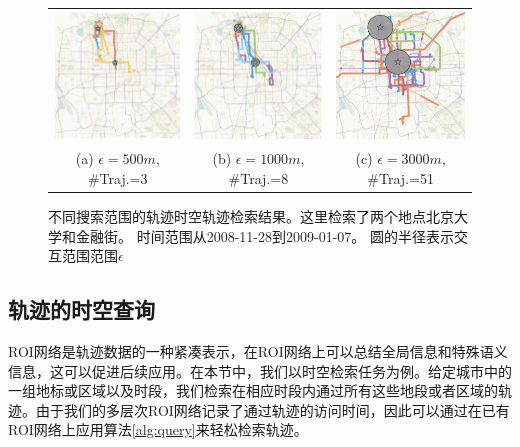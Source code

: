 \tabcolsep=1pt
\begin{figure}[!t]
\centering
\begin{tabular}{ccc}
\includegraphics[width=48mm]{pics/q500.eps}&
\includegraphics[width=48mm]{pics/q1000.eps}&
\includegraphics[width=48mm]{pics/q3000.eps}\\
(a) $\epsilon = 500m$, \#Traj.=3 & (b) $\epsilon = 1000m$, \#Traj.=8 & (c) $\epsilon = 3000m$, \#Traj.=51  \\
\end{tabular}
\caption{不同搜索范围的轨迹时空轨迹检索结果。这里检索了两个地点北京大学和金融街。 时间范围从2008-11-28到2009-01-07。 圆的半径表示交互范围范围$\epsilon$
}
\label{fig:queryResult}
\end{figure}


\subsection{轨迹的时空查询}
ROI网络是轨迹数据的一种紧凑表示，在ROI网络上可以总结全局信息和特殊语义信息，这可以促进后续应用。在本节中，我们以时空检索任务为例。给定城市中的一组地标或区域以及时段，我们检索在相应时段内通过所有这些地段或者区域的轨迹。由于我们的多层次ROI网络记录了通过轨迹的访问时间，因此可以通过在已有ROI网络上应用算法\ref{alg:query}来轻松检索轨迹。

